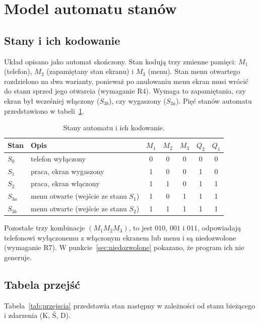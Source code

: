 \section{Model automatu stanów}
\label{sec:automat}

\subsection{Stany i ich kodowanie}
Układ opisano jako automat skończony. Stan kodują trzy zmienne
pamięci: $M_1$ (telefon), $M_2$ (zapamiętany stan ekranu) i $M_3$
(menu). Stan menu otwartego rozdzielono na dwa warianty, ponieważ po
anulowaniu menu ekran musi wrócić do stanu sprzed jego otwarcia
(wymaganie R4). Wymaga to zapamiętania, czy ekran był wcześniej
włączony ($S_{3b}$), czy wygaszony ($S_{3a}$). Pięć stanów
automatu przedstawiono w tabeli~\ref{tab:stany}.

\begin{table}[H]
\centering
\caption{Stany automatu i ich kodowanie.}
\label{tab:stany}
\begin{tabular}{llccc|cc}
\toprule
Stan & Opis & $M_1$ & $M_2$ & $M_3$ & $Q_2$ & $Q_1$ \\
\midrule
$S_0$    & telefon wyłączony                    & 0 & 0 & 0 & 0 & 0 \\
$S_1$    & praca, ekran wygaszony               & 1 & 0 & 0 & 1 & 0 \\
$S_2$    & praca, ekran włączony                & 1 & 1 & 0 & 1 & 1 \\
$S_{3a}$ & menu otwarte (wejście ze stanu $S_1$)& 1 & 0 & 1 & 1 & 1 \\
$S_{3b}$ & menu otwarte (wejście ze stanu $S_2$)& 1 & 1 & 1 & 1 & 1 \\
\bottomrule
\end{tabular}
\end{table}

Pozostałe trzy kombinacje $(M_1M_2M_3)$, to jest $010$, $001$ i $011$,
odpowiadają telefonowi wyłączonemu z włączonym ekranem lub menu i są
niedozwolone (wymaganie R7). W punkcie~\ref{sec:niedozwolone}
pokazano, że program ich nie generuje.

\subsection{Tabela przejść}
Tabela~\ref{tab:przejscia} przedstawia stan następny w zależności
od stanu bieżącego i zdarzenia (K, Ś, D).

